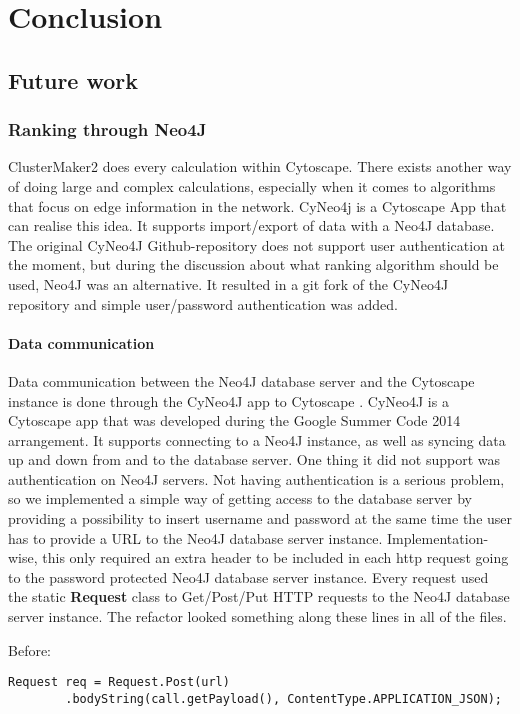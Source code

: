 \part{Conclusion}
\label{pa:conclusion}
\chapter{Future work}
\section{Ranking through Neo4J}
ClusterMaker2 does every calculation within Cytoscape. There exists another way
of doing large and complex calculations, especially when it comes to algorithms
that focus on edge information in the network. CyNeo4j\cite{cyneo4j} is
a Cytoscape App that can realise this idea. It supports import/export of data
with a Neo4J\cite{neo4j} database. The original CyNeo4J Github-repository does
not support user authentication at the moment, but during the discussion about
what ranking algorithm should be used, Neo4J was an alternative. It resulted in
a git fork\cite{git-fork} of the CyNeo4J repository and simple user/password
authentication was added.

\subsection{Data communication}
Data communication between the Neo4J database server and the Cytoscape instance
is done through the CyNeo4J app to Cytoscape \cite{cyneo4j}. CyNeo4J is a
Cytoscape app that was developed during the Google Summer Code 2014 arrangement.
It supports connecting to a Neo4J instance, as well as syncing data up and down
from and to the database server. One thing it did not support was authentication
on Neo4J servers. Not having authentication is a serious problem, so we
implemented a simple way of getting access to the database server by providing a
possibility to insert username and password at the same time the user has to
provide a URL to the Neo4J database server instance. Implementation-wise, this
only required an extra header to be included in each http request going to the
password protected Neo4J database server instance. Every request used the static
\textbf{Request} class to Get/Post/Put HTTP requests to the Neo4J database
server instance. The refactor looked something along these lines in all of the
files.

Before:
\begin{verbatim}
Request req = Request.Post(url)
        .bodyString(call.getPayload(), ContentType.APPLICATION_JSON);
\end{verbatim}

